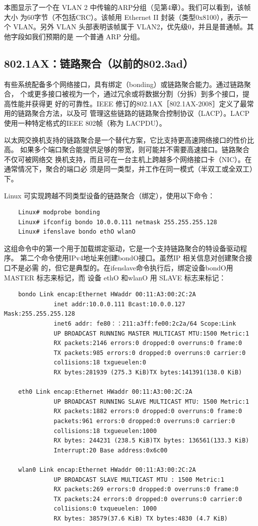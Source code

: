 本图显示了一个在 VLAN 2 中传输的ARP分组（见第4章）。我们可以看到，该帧大小
为60字节（不包括CRC）。该帧用 Ethernet II 封装（类型0x8100），表示一个 VLAN。另外
VLAN 头部表明该帧属于 VLAN2，优先级0，并且是普通帧。其他字段如我们预期的是
一个普通 ARP 分组。

\subsection{802.1AX：链路聚合（以前的802.3ad）}

有些系统配备多个网络接口，具有绑定（bonding）或链路聚合能力。通过链路聚合，
个或更多接口被视为一个，通过冗余或将数据分割（分拆）到多个接口，提高性能并获得更
好的可靠性。IEEE 修订的802.1AX［802.1AX-2008］定义了最常用的链路聚合方法，以及可
管理这些链路的链路聚合控制协议（LACP）。LACP 使用一种特定格式的IEEE 802帧（称为
LACPDU）。

以太网交换机支持的链路聚合是一个替代方案，它比支持更高速网络接口的性价比高。
如果多个端口聚合能提供足够的带宽，则可能并不需要高速接口。链路聚合不仅可被网络交
换机支持，而且可在一台主机上跨越多个网络接口卡（NIC）。在通常情况下，聚合的端口必
须是同一类型，并工作在同一模式（半双工或全双工）下。

Linux 可实现跨越不同类型设备的链路聚合（绑定），使用以下命令：
\begin{verbatim}
    Linux# modprobe bonding
    Linux# ifconfig bondo 10.0.0.111 netmask 255.255.255.128
    Linux# ifenslave bondo ethO wlanO
\end{verbatim}

这组命令中的第一个用于加载绑定驱动，它是一个支持链路聚合的特设备驱动程序。
第二个命令使用IPv4地址来创建bondO接口。虽然IP 相关信息对创建聚合接口不是必需
的，但它是典型的。在ifenslave命令执行后，绑定设备bondO用MASTER 标志来标记，而
设备 ethO 和wlanO 用 SLAVE 标志来标记：
\begin{verbatim}
    bondo Link encap:Ethernet HWaddr 00:11:A3:00:2C:2A
              inet addr:10.0.0.111 Bcast:10.0.0.127 Mask:255.255.255.128
              inet6 addr: fe80：：211:a3ff:fe00:2c2a/64 Scope:Link
              UP BROADCAST RUNNING MASTER MULTICAST MTU:1500 Metric:1
              RX packets:2146 errors:0 dropped:0 overruns:0 frame:0
              TX packets:985 errors:0 dropped:0 overruns:0 carrier:0
              col1isions:18 txgueuelen:0
              RX bytes:281939 (275.3 KiB)TX bytes:141391(138.0 KiB)

    eth0 Link encap:Ethernet HWaddr 00:11:A3:00:2C:2A
              UP BROADCAST RUNNING SLAVE MULTICAST MTU: 1500 Metric:1
              RX packets:1882 errors:0 dropped:0 overruns:0 frame:0
              packets:961 errors:0 dropped:0 overruns:0 carrier:0
              collisions:18 txgueuelen:1000
              RX bytes: 244231 (238.5 KiB)TX bytes: 136561(133.3 KiB)
              Interrupt:20 Base address:0x6c00

    wlan0 Link encap:Ethernet HWaddr 00:11:A3:00:2C:2A
              UP BROADCAST SLAVE MULTICAST MTU : 1500 Metric:1
              RX packets:269 errors:0 dropped:0 overruns:0 frame:0
              TX packets:24 errors:0 dropped:0 overruns:0 carrier:0
              col1isions:0 txqueuelen: 1000
              RX bytes: 38579(37.6 KiB) TX bytes:4830 (4.7 KiB)
\end{verbatim}

